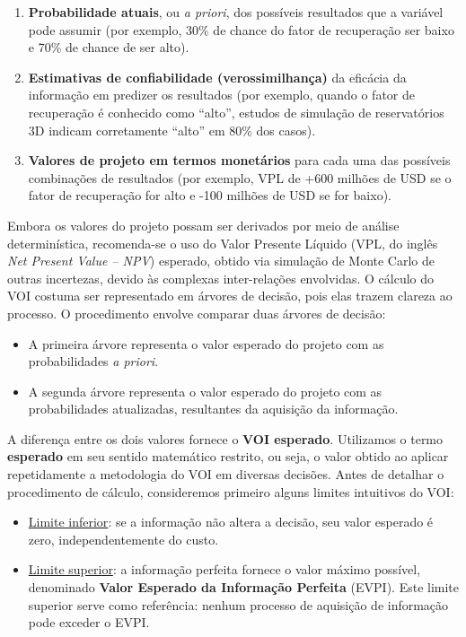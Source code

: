 \begin{enumerate}[label=\textbf{\roman*)}]
    \item \textbf{Probabilidade atuais}, ou \textit{a priori}, dos possíveis resultados que a variável pode assumir (por exemplo, 30\% de chance do fator de recuperação ser baixo e 70\% de chance de ser alto).  
    \item \textbf{Estimativas de confiabilidade (verossimilhança)} da eficácia da informação em predizer os resultados (por exemplo, quando o fator de recuperação é conhecido como ``alto'', estudos de simulação de reservatórios 3D indicam corretamente ``alto'' em 80\% dos casos).  
    \item \textbf{Valores de projeto em termos monetários} para cada uma das possíveis combinações de resultados (por exemplo, VPL de +600 milhões de USD se o fator de recuperação for alto e  -100 milhões de USD se for baixo).  
\end{enumerate}

Embora os valores do projeto possam ser derivados por meio de análise determinística, recomenda-se o uso do Valor Presente Líquido (VPL, do inglês \textit{Net Present Value -- NPV}) esperado, obtido via simulação de Monte Carlo de outras incertezas, devido às complexas inter-relações envolvidas. O cálculo do VOI costuma ser representado em árvores de decisão, pois elas trazem clareza ao processo. O procedimento envolve comparar duas árvores de decisão:  

\begin{itemize}
    \item A primeira árvore representa o valor esperado do projeto com as probabilidades \textit{a priori}.  
    \item A segunda árvore representa o valor esperado do projeto com as probabilidades atualizadas, resultantes da aquisição da informação.  
\end{itemize}

A diferença entre os dois valores fornece o \textbf{VOI esperado}. Utilizamos o termo \textbf{esperado} em seu sentido matemático restrito, ou seja, o valor obtido ao aplicar repetidamente a metodologia do VOI em diversas decisões. Antes de detalhar o procedimento de cálculo, consideremos primeiro alguns limites intuitivos do VOI:

\begin{itemize}
    \item \underline{Limite inferior}: se a informação não altera a decisão, seu valor esperado é zero, independentemente do custo.  
    \item \underline{Limite superior}: a informação perfeita fornece o valor máximo possível, denominado \textbf{Valor Esperado da Informação Perfeita} (EVPI). Este limite superior serve como referência: nenhum processo de aquisição de informação pode exceder o EVPI.  
\end{itemize}

